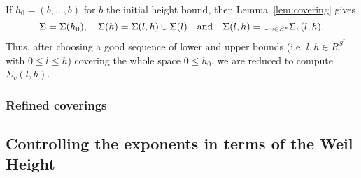 If $h_0=(b,\dotsc,b)$ for $b$ the initial height bound, then
Lemma~\ref{lem:covering} gives  $$\Sigma=\Sigma(h_0), \quad \Sigma(h)=\Sigma(l,h)\cup \Sigma(l) \quad \textnormal{and} \quad \Sigma(l,h)=\cup_{v\in S^*}\Sigma_v(l,h).$$
Thus, after choosing a good sequence of lower and upper bounds (i.e. $l,h\in R^{S^*}$ with $0\leq l\leq h$) covering the whole space $0\leq h_0$, we are reduced to compute $\Sigma_v(l,h)$.
%
%
\subsubsection{Refined coverings}
%
%
%
%
%

\subsection{Controlling the exponents in terms of the Weil Height}

